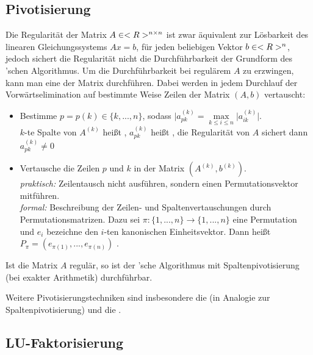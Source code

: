 \subsection{Pivotisierung}

Die Regularität der Matrix $A\in<R>^{n\times n}$ ist zwar äquivalent zur Lösbarkeit des linearen Gleichungssystems $Ax=b$, für jeden beliebigen Vektor $b\in<R>^n$, jedoch sichert die Regularität nicht die Durchführbarkeit der Grundform des 'schen Algorithmus. Um die Durchführbarkeit bei regulärem $A$ zu erzwingen, kann man eine  der Matrix durchführen. Dabei werden in jedem Durchlauf der Vorwärtselimination auf bestimmte Weise Zeilen der Matrix $(A,b)$ vertauscht:
\begin{itemize}
	\item Bestimme $p=p(k)\in\{k,...,n\}$, sodass $\vert a_{pk}^{(k)}=\max\limits_{k\le i\le n}\vert a_{ik}^{(k)}\vert$. \\
	$k$-te Spalte von $A^{(k)}$ heißt , $a_{pk}^{(k)}$ heißt , die Regularität von $A$ sichert dann $a_{pk}^{(k)}\neq 0$
	\item Vertausche die Zeilen $p$ und $k$ in der Matrix $(A^{(k)},b^{(k)})$. \\
	\emph{praktisch:} Zeilentausch nicht ausführen, sondern einen Permutationsvektor mitführen. \\
	\emph{formal:} Beschreibung der Zeilen- und Spaltenvertauschungen durch Permutationsmatrizen. Dazu sei $\pi:\{1,...,n\}\to\{1,...,n\}$ eine Permutation und $e_i$ bezeichne den $i$-ten kanonischen Einheitsvektor. Dann heißt $P_\pi=(e_{\pi(1)},...,e_{\pi(n)})$ .
\end{itemize}

\begin{proposition}
	Ist die Matrix $A$ regulär, so ist der 'sche Algorithmus mit Spaltenpivotisierung (bei exakter Arithmetik) durchführbar.
\end{proposition}

Weitere Pivotisierungstechniken sind insbesondere die  (in Analogie zur Spaltenpivotisierung) und die .

\subsection{LU-Faktorisierung}

